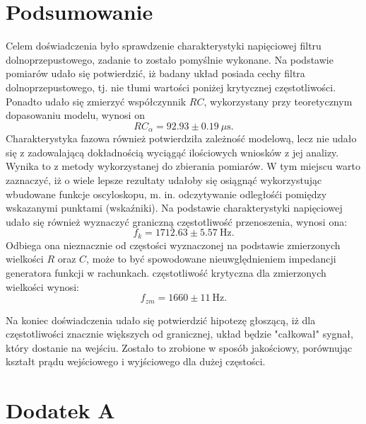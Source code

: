 \documentclass[10pt,a4paper]{article}
\begin{document}
\section*{Podsumowanie}
Celem doświadczenia było sprawdzenie charakterystyki napięciowej filtru dolnoprzepustowego, zadanie to zostało pomyślnie wykonane. Na podstawie pomiarów udało się potwierdzić, iż badany układ posiada cechy filtra dolnoprzepustowego, tj. nie tłumi wartości poniżej krytycznej częstotliwości.
Ponadto udało się zmierzyć współczynnik $RC$, wykorzystany przy teoretycznym dopasowaniu modelu, wynosi on 
$$ RC_{\alpha} = 92.93 \pm 0.19 \ \mu \text{s}.$$
Charakterystyka fazowa również potwierdziła zależność modelową, lecz nie udało się z zadowalającą dokładnością wyciągąć ilościowych wniosków z jej analizy. Wynika to z metody wykorzystanej do zbierania pomiarów. W tym miejscu warto zaznaczyć, iż o wiele lepsze rezultaty udałoby się osiągnąć wykorzystując wbudowane funkcje oscyloskopu, m. in. odczytywanie odległośći pomiędzy wskazanymi punktami (wskaźniki). 
Na podstawie charakterystyki napięciowej udało się również wyznaczyć graniczną częstotliwość przenoszenia, wynosi ona:
$$ f_k = 1712.63 \pm 5.57 \ \text{Hz}. $$ Odbiega ona nieznacznie
od częstości wyznaczonej na podstawie zmierzonych wielkości $R$ oraz $C$, może to być spowodowane nieuwględnieniem impedancji generatora funkcji w rachunkach. częstotliwość krytyczna dla zmierzonych wielkości wynosi: $$ f_{zm} = 1660 \pm 11 \ \text{Hz}. $$


Na koniec doświadczenia
udało się potwierdzić hipotezę głoszącą, iż dla częstotliwości znacznie większych od granicznej, układ będzie "całkował" sygnał, który dostanie na wejściu. Zostało to zrobione w sposób jakościowy, porównując kształt prądu wejściowego i wyjściowego dla dużej częstości.


\section*{Dodatek A}
\end{document}
